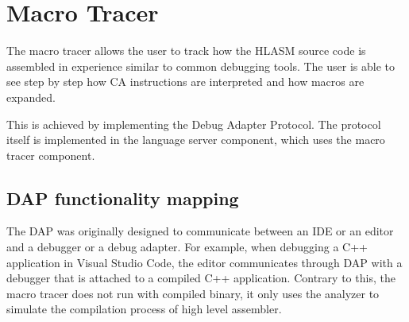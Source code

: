 \chapter{Macro Tracer}

The macro tracer allows the user to track how the HLASM source code is assembled in experience similar to common debugging tools. The user is able to see step by step how CA instructions are interpreted and how macros are expanded.

This is achieved by implementing the Debug Adapter Protocol. The protocol itself is implemented in the language server component, which uses the macro tracer component.

\section{DAP functionality mapping}

The DAP was originally designed to communicate between an IDE or an editor and a debugger or a debug adapter. For example, when debugging a C++ application in Visual Studio Code, the editor communicates through DAP with a debugger that is attached to a compiled C++ application. Contrary to this, the macro tracer does not run with compiled binary, it only uses the analyzer to simulate the compilation process of high level assembler.

